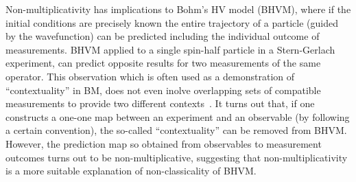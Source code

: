 \documentclass[british,aps,prl,superscriptaddress,nofootinbib,times,reprint]{revtex4-1}
\theoremstyle{plain}
\theoremstyle{plain}
\theoremstyle{definition}
\theoremstyle{remark}
\theoremstyle{remark}
\theoremstyle{remark}
\theoremstyle{plain}
\theoremstyle{plain}
\theoremstyle{plain}
\theoremstyle{definition}
\theoremstyle{definition}
\begin{document}
Non-multiplicativity has implications to Bohm's HV
model (BHVM), where if the initial conditions are
precisely known the entire trajectory of a
particle (guided by the wavefunction) can be
predicted including the individual outcome of
measurements.  BHVM applied to a single spin-half
particle in a Stern-Gerlach experiment, can
predict opposite results for two measurements of
the same operator.  This observation which is
often used as a demonstration of ``contextuality''
in BM, does not even inolve  overlapping sets of
compatible measurements to provide two different
contexts~\cite{HardyCntxBM}.  It turns out that,
if one constructs  a one-one map between an
experiment and an observable (by following a
certain convention), the so-called ``contextuality''
can be removed from BHVM.  However, the prediction
map so obtained from observables to measurement
outcomes turns out to be non-multiplicative,
suggesting that non-multiplicativity is a more
suitable explanation of non-classicality
of BHVM.
\end{document}

